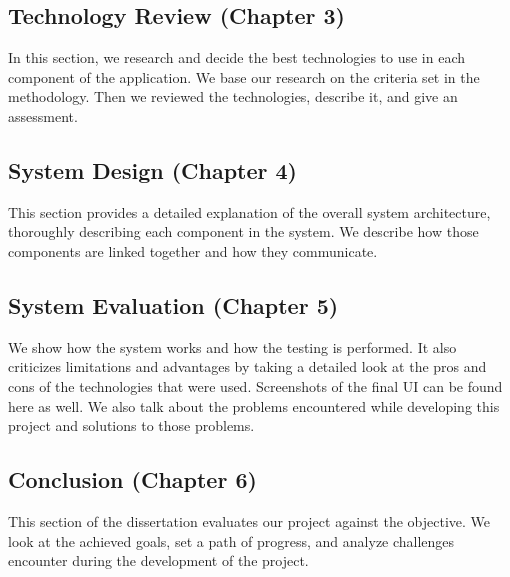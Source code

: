 \subsection{Technology Review (Chapter 3)}

In this section, we research and decide the best technologies to use in each component of the application. We base our research on the criteria set in the methodology.  Then we reviewed the technologies, describe it, and give an assessment.

\subsection{System Design (Chapter 4)}
This section provides a detailed explanation of the overall system architecture, thoroughly describing each component in the system. We describe how those components are linked together and how they communicate.

\subsection{System Evaluation (Chapter 5)}
We show how the system works and how the testing is performed.
It also criticizes limitations and advantages by taking a detailed look at the pros and cons of the technologies that were used.
Screenshots of the final UI can be found here as well.
We also talk about the problems encountered while developing this project and solutions to those problems. 
\subsection{Conclusion (Chapter 6)}
This section of the dissertation evaluates our project against the objective. We look at the achieved goals, set a path of progress, and analyze challenges encounter during the development of the project.


